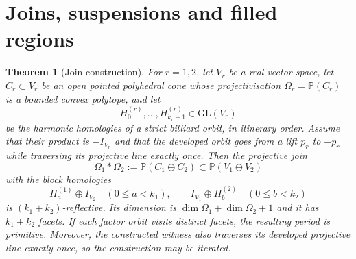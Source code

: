 \documentclass[11pt,a4paper]{article}
\theoremstyle{plain}
\newtheorem{theorem}{Theorem}[section]
\theoremstyle{definition}
\theoremstyle{remark}
\begin{document}
\section{Joins, suspensions and filled regions}

\begin{theorem}[Join construction]\label{thm:join}
For $r=1,2$, let $V_r$ be a real vector space, let $C_r\subset V_r$ be an open
pointed polyhedral cone whose projectivisation $\Omega_r=\mathbb P(C_r)$ is a
bounded convex polytope, and let
\[
 H^{(r)}_0,\ldots,H^{(r)}_{k_r-1}\in\mathrm{GL}(V_r)
\]
be the harmonic homologies of a strict billiard orbit, in itinerary order. Assume
that their product is $-I_{V_r}$ and that the developed orbit goes from a lift $p_r$
to $-p_r$ while traversing its projective line exactly once.  Then the projective
join
\[
 \Omega_1*\Omega_2:=\mathbb P(C_1\oplus C_2)
       \subset\mathbb P(V_1\oplus V_2)
\]
with the block homologies
\[
 H^{(1)}_a\oplus I_{V_2}\quad(0\le a<k_1),\qquad
 I_{V_1}\oplus H^{(2)}_b\quad(0\le b<k_2)
\]
is $(k_1+k_2)$-reflective.  Its dimension is
$\dim\Omega_1+\dim\Omega_2+1$ and it has $k_1+k_2$ facets.  If each factor orbit
visits distinct facets, the resulting period is primitive.  Moreover, the
constructed witness also traverses its developed projective line exactly once, so
the construction may be iterated.
\end{theorem}
\end{document}
